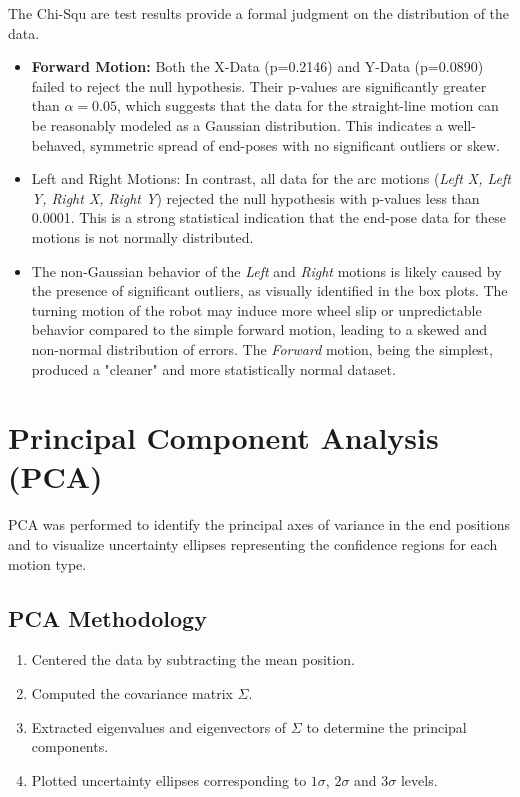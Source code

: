 The Chi-Squ
are test results provide a formal judgment on the distribution of the data.

\begin{itemize}
    \item \textbf{Forward Motion:} Both the X-Data (p=0.2146) and Y-Data (p=0.0890) failed to reject the null hypothesis. Their p-values are significantly greater than $\alpha=0.05$, which suggests that the data for the straight-line motion can be reasonably modeled as a Gaussian distribution. This indicates a well-behaved, symmetric spread of end-poses with no significant outliers or skew.

    \item Left and Right Motions: In contrast, all data for the arc motions (\textit{Left X, Left Y, Right X, Right Y}) rejected the null hypothesis with p-values less than 0.0001. This is a strong statistical indication that the end-pose data for these motions is not normally distributed.

    \item The non-Gaussian behavior of the \textit{Left} and \textit{Right} motions is likely caused by the presence of significant outliers, as visually identified in the box plots. The turning motion of the robot may induce more wheel slip or unpredictable behavior compared to the simple forward motion, leading to a skewed and non-normal distribution of errors. The \textit{Forward} motion, being the simplest, produced a "cleaner" and more statistically normal dataset.
\end{itemize}




\section{Principal Component Analysis (PCA)}

PCA was performed to identify the principal axes of variance in the end positions and to visualize uncertainty ellipses representing the confidence regions for each motion type.

\subsection{PCA Methodology}

\begin{enumerate}
    \item Centered the data by subtracting the mean position.
    \item Computed the covariance matrix $\Sigma$.
    \item Extracted eigenvalues and eigenvectors of $\Sigma$ to determine the principal components.
    \item Plotted uncertainty ellipses corresponding to $1\sigma$, $2\sigma$ and $3\sigma$ levels.
\end{enumerate}


